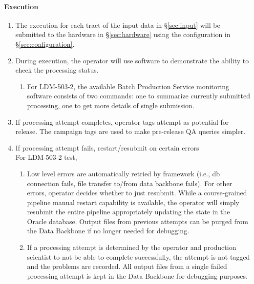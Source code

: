 \paragraph{Execution}
\begin{enumerate}
  \item{The execution for each tract of the input data in \S\ref{sec:input} will be submitted to the hardware in \S\ref{sec:hardware} using the configuration in \S\ref{sec:configuration}.}
  \item{During execution, the operator will use software to demonstrate the ability to check the processing status.}
  \begin{enumerate}
    \item{For LDM-503-2, the available Batch Production Service monitoring software consists of two commands: one to summarize currently submitted processing, one to get more details of single submission.}
  \end{enumerate}
  \item{If processing attempt completes, operator tags attempt as potential for release.  The campaign tags are used to make pre-release QA queries simpler.}
  \item{If processing attempt fails, restart/resubmit on certain errors} \\
    For LDM-503-2 test,
    \begin{enumerate}
        \item{Low level errors are automatically retried by framework (i.e., db connection fails, file transfer to/from data backbone fails).   For other errors, operator decides whether to just resubmit.   While a course-grained pipeline manual restart capability is available, the operator will simply resubmit the entire pipeline appropriately updating the state in the Oracle database.  Output files from previous attempts can be purged from the Data Backbone if no longer needed for debugging.}
        \item{If a processing attempt is determined by the operator and production scientist to not be able to complete successfully, the attempt is not tagged and the problems are recorded.  All output files from a single failed processing attempt is kept in the Data Backbone for debugging purposes.} 
    \end{enumerate}
\end{enumerate}

